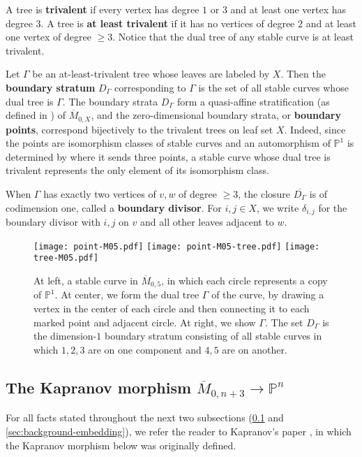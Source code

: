 \documentclass[11pt]{amsart}
\newcommand{\Mbar}{\overline{M}}
\newcommand{\PP}{\mathbb{P}}
\numberwithin{thm}{section}
\numberwithin{equation}{section}
\numberwithin{figure}{section}
\theoremstyle{definition}
\begin{document}
A tree is \textbf{trivalent} if every vertex has degree $1$ or $3$ and at least one vertex has degree $3$. A tree is \textbf{at least trivalent} if it has no vertices of degree $2$ and at least one vertex of degree $\ge 3$.  Notice that the dual tree of any stable curve is at least trivalent.

Let $\Gamma$ be an at-least-trivalent tree whose leaves are labeled by $X$.  Then the \textbf{boundary stratum} $D_\Gamma$ corresponding to $\Gamma$ is the set of all stable curves whose dual tree is $\Gamma$.  The boundary strata $D_\Gamma$ form a quasi-affine stratification (as defined in \cite{3264}) of $\Mbar_{0,X}$, and the zero-dimensional boundary strata, or \textbf{boundary points}, correspond bijectively to the trivalent trees on leaf set $X$.  Indeed, since the points are isomorphism classes of stable curves and an automorphism of $\PP^1$ is determined by where it sends three points, a stable curve whose dual tree is trivalent represents the only element of its isomorphism class.

When $\Gamma$ has exactly two vertices of $v, w$ of degree $\geq 3$, the closure $\overline{D_{\Gamma}}$ is of codimension one, called a \textbf{boundary divisor}. For $i, j \in X$, we write $\delta_{i, j}$ for the boundary divisor with $i, j$ on $v$ and all other leaves adjacent to $w$.

\begin{figure}
    \centering
    \texttt{[image: point-M05.pdf]}\hspace{1cm} \texttt{[image: point-M05-tree.pdf]}\hspace{1cm} \texttt{[image: tree-M05.pdf]}
    \caption{At left, a stable curve in $\Mbar_{0,5}$, in which each circle represents a copy of $\PP^1$.  At center, we form the dual tree $\Gamma$ of the curve, by drawing a vertex in the center of each circle and then connecting it to each marked point and adjacent circle. At right, we show $\Gamma$.  The set $D_\Gamma$ is the dimension-$1$ boundary stratum consisting of all stable curves in which $1,2,3$ are on one component and $4,5$ are on another.}
    \label{fig:strata}
\end{figure}

\subsection{The Kapranov morphism $\Mbar_{0,n+3} \to \mathbb{P}^n$}\label{sec:Kapranov}

For all facts stated throughout the next two subsections (\ref{sec:Kapranov} and \ref{sec:background-embedding}), we refer the reader to Kapranov's paper \cite{Ka1}, in which the Kapranov morphism below was originally defined.
\end{document}
